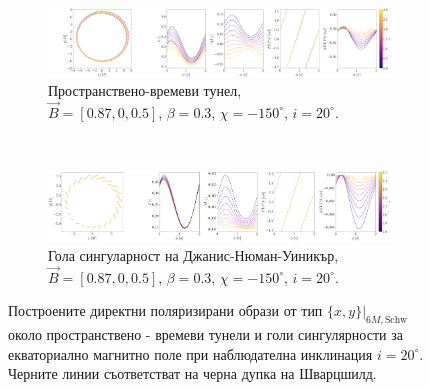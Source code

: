 \documentclass[12pt]{article}
\numberwithin{equation}{section}
\numberwithin{figure}{section}
\begin{document}
	\begin{figure}[!htb]
		\begin{subfigure}{16cm}
			\hspace{-1.0em}
			\includegraphics[scale = 0.15]{Section_7_Polarized_Emission/WH_delta_fig_B_0.87_0.5_0_20_deg_r6.png}
			\caption{Пространствено-времеви тунел,\\ $\vec{B} = [0.87, 0, 0.5]$, $\beta = 0.3$, $\chi = -150^\circ$, $i = 20^\circ$.} 
		\end{subfigure}\\
		\begin{subfigure}{17cm}
			\hspace{-0.2em}
			\includegraphics[scale = 0.15]{Section_7_Polarized_Emission/JNW_delta_figs_B_0.87_0.0_0.5_20_deg_direct.png}
			\caption{Гола сингуларност на Джанис-Нюман-Уиникър,\\  $\vec{B} = [0.87, 0, 0.5]$, $\beta = 0.3$, $\chi = -150^\circ$, $i = 20^\circ$.}
		\end{subfigure}
		\caption[Поляризирани директни образи от тип $\{x,y\}\vert_{6M, \text{Schw}}$ около пространствено - времеви тунели и голи сингулярности за екваториално магнитно поле при $i = 20^\circ$.]{\small Построените директни поляризирани образи от тип $\{x,y\}\vert_{6M, \text{Schw}}$ около пространствено - времеви тунели  и голи сингулярности за екваториално магнитно поле при наблюдателна инклинация $i = 20^\circ$. Черните линии съответстват на черна дупка на Шварцшилд.} 
		\label{Direct_image_deltas_20}
	\end{figure}
	
\end{document}
